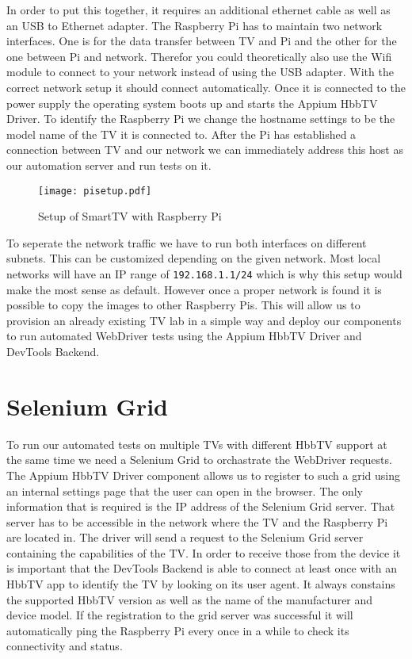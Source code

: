 In order to put this together, it requires an additional ethernet cable as well as an USB to Ethernet adapter. The Raspberry Pi has to maintain two network interfaces. One is for the data transfer between TV and Pi and the other for the one between Pi and network. Therefor you could theoretically also use the Wifi module to connect to your network instead of using the USB adapter. With the correct network setup it should connect automatically. Once it is connected to the power supply the operating system boots up and starts the Appium HbbTV Driver. To identify the Raspberry Pi we change the hostname settings to be the model name of the TV it is connected to. After the Pi has established a connection between TV and our network we can immediately address this host as our automation server and run tests on it.

\vspace{1cm}
\begin{figure}[htb]
  \centering
  \texttt{[image: pisetup.pdf]}\\
  \caption{Setup of SmartTV with Raspberry Pi}\label{fig:pisetup}
\end{figure}
\vspace{0.5cm}

To seperate the network traffic we have to run both interfaces on different subnets. This can be customized depending on the given network. Most local networks will have an IP range of \texttt{192.168.1.1/24} which is why this setup would make the most sense as default. However once a proper network is found it is possible to copy the images to other Raspberry Pis. This will allow us to provision an already existing TV lab in a simple way and deploy our components to run automated WebDriver tests using the Appium HbbTV Driver and DevTools Backend.

\section{Selenium Grid\label{sec:grid}}

To run our automated tests on multiple TVs with different HbbTV support at the same time we need a Selenium Grid to orchastrate the WebDriver requests. The Appium HbbTV Driver component allows us to register to such a grid using an internal settings page that the user can open in the browser. The only information that is required is the IP address of the Selenium Grid server. That server has to be accessible in the network where the TV and the Raspberry Pi are located in. The driver will send a request to the Selenium Grid server containing the capabilities of the TV. In order to receive those from the device it is important that the DevTools Backend is able to connect at least once with an HbbTV app to identify the TV by looking on its user agent. It always constains the supported HbbTV version as well as the name of the manufacturer and device model. If the registration to the grid server was successful it will automatically ping the Raspberry Pi every once in a while to check its connectivity and status.

